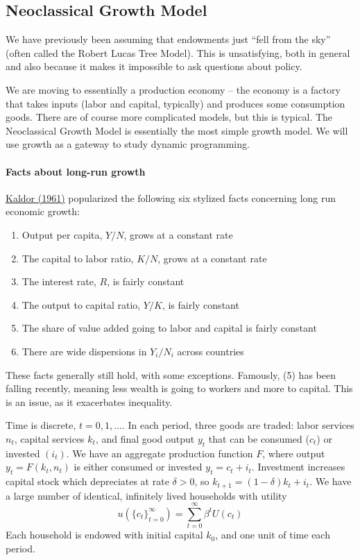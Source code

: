 \documentclass[10pt]{article}
\begin{document}
\newpage

\subsection{Neoclassical Growth Model}

We have previously been assuming that endowments just ``fell from the sky'' (often called the Robert Lucas Tree Model). This is unsatisfying, both in general and also because it makes it impossible to ask questions about policy.

We are moving to essentially a production economy -- the economy is a factory that takes inputs (labor and capital, typically) and produces some consumption goods. There are of course more complicated models, but this is typical. The Neoclassical Growth Model is essentially the most simple growth model. We will use growth as a gateway to study dynamic programming.

\paragraph{Facts about long-run growth} \href{https://link.springer.com/chapter/10.1007/978-1-349-08452-4_10}{Kaldor (1961)} popularized the following six stylized facts concerning long run economic growth:
\begin{enumerate}
	\item Output per capita, $Y / N$, grows at a constant rate
	\item The capital to labor ratio, $K / N$, grows at a constant rate
	\item The interest rate, $R$, is fairly constant
	\item The output to capital ratio, $Y / K$, is fairly constant
	\item The share of value added going to labor and capital is fairly constant
	\item There are wide dispersions in $Y_i / N_i$ across countries
\end{enumerate}

These facts generally still hold, with some exceptions. Famously, (5) has been falling recently, meaning less wealth is going to workers and more to capital. This is an issue, as it exacerbates inequality. 

\begin{model}
	 Time is discrete, $t = 0,1,\dots$. In each period, three goods are traded: labor services $n_t$, capital services $k_t$, and final good output $y_t$ that can be consumed ($c_t$) or invested $(i_t)$. We have an aggregate production function $F$, where output $y_t = F(k_t,n_t)$ is either consumed or invested $y_t = c_t + i_t$. Investment increases capital stock which depreciates at rate $\delta > 0$, so $k_{t+1} = (1-\delta) k_t + i_t$. We have a large number of identical, infinitely lived households with utility
	\[
	u(\{c_t\}_{t=0}^\infty) = \sum_{t=0}^\infty \beta^t U(c_t)
	\]
	Each household is endowed with initial capital $k_0$, and one unit of time each period.
\end{model}
\end{document}
